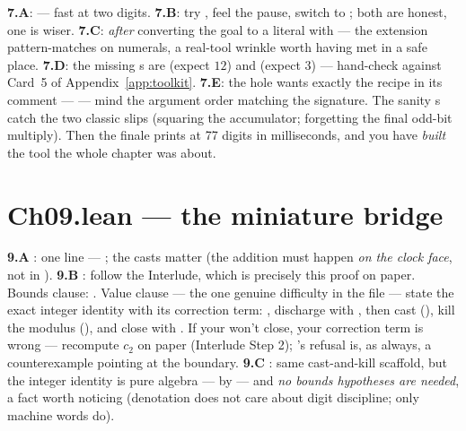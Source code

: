 \textbf{7.A}:  --- fast at two digits. \textbf{7.B}: try
, feel the pause, switch to ; both are
honest, one is wiser. \textbf{7.C}:  \emph{after}
converting the goal to a literal with
 --- the extension pattern-matches on
numerals, a real-tool wrinkle worth having met in a safe place.
\textbf{7.D}: the missing s are 
(expect $12$) and  (expect $3$) --- hand-check
against Card~5 of Appendix~\ref{app:toolkit}. \textbf{7.E}: the
 hole wants exactly the recipe in its comment ---
 --- mind the argument order matching the
signature. The sanity s catch the two classic slips
(squaring the accumulator; forgetting the final odd-bit multiply).
Then the finale prints  at 77 digits in milliseconds, and you
have \emph{built} the tool the whole chapter was about.

\section{Ch09.lean --- the miniature bridge}

\textbf{9.A }: one line ---
; the casts matter (the
addition must happen \emph{on the clock face}, not in ).
\textbf{9.B }: follow the Interlude, which is precisely
this proof on paper. Bounds clause: .
Value clause --- the one genuine difficulty in the file --- state the
exact integer identity with its correction term:
, discharge with
, then cast
(), kill the modulus
(), and close with
. If your  won't close, your
correction term is wrong --- recompute $c_2$ on paper (Interlude Step
2); 's refusal is, as always, a counterexample pointing at
the boundary. \textbf{9.C }: same cast-and-kill
scaffold, but the integer identity is pure algebra ---
by  --- and \emph{no bounds hypotheses are needed}, a fact
worth noticing (denotation does not care about digit discipline; only
machine words do).

